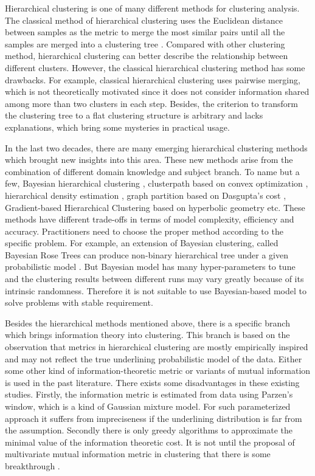 Hierarchical clustering is one of many different methods for clustering analysis.
The classical method of hierarchical clustering uses the Euclidean distance between samples
as the metric to merge the most similar pairs until all the samples are merged into a clustering
tree \citep{slink}. Compared with other clustering method, hierarchical clustering can better describe the relationship between different clusters. However, the classical hierarchical clustering method has some
drawbacks. For example, classical hierarchical clustering uses pairwise merging, which is not theoretically motivated since it does not consider information shared among more than two clusters in each step. Besides, the criterion to transform the clustering tree to a flat clustering structure is arbitrary and lacks explanations, which bring some mysteries in practical
usage.

In the last two decades, there are many emerging hierarchical clustering methods which brought new insights into this area. These new methods arise from the combination of different domain knowledge and
subject branch. To name but a few, 
Bayesian hierarchical clustering \citep{bhc},
clusterpath based on convex optimization \citep{hocking2011clusterpath},
hierarchical density estimation \citep{hde}, 
graph partition based on Dasgupta's cost \citep{dasgupta2016cost},
Gradient-based Hierarchical Clustering based on hyperbolic geometry \citep{hyperbolic} etc.
These methods have different trade-offs in terms of model complexity, efficiency and accuracy.
Practitioners need to choose the proper method according to the specific problem.
For example, an extension of Bayesian clustering, called Bayesian Rose Trees 
can produce non-binary hierarchical tree
under a given probabilistic model \citep{blundell2011discovering}.
But Bayesian model has many hyper-parameters to tune and the clustering results between different runs may vary greatly because of its intrinsic randomness. Therefore it is not suitable to use Bayesian-based model to solve problems with stable requirement.


Besides the hierarchical methods mentioned above, there is a specific branch which brings information theory into clustering. This branch is based on the observation that metrics in hierarchical clustering
are mostly empirically inspired and may not reflect the true underlining probabilistic model of the data.
Either some other kind of information-theoretic metric \citep{ic2002} or variants of mutual information \citep{mim} is used in the past literature. There exists some disadvantages in these existing studies. Firstly, the information metric is estimated from data using Parzen's window, which is a kind of Gaussian mixture model. For such parameterized approach it suffers from impreciseness if the underlining distribution is far from the assumption.
Secondly there is only greedy algorithms to approximate the minimal value of the information theoretic cost. It is not until the proposal of multivariate mutual information metric in clustering that there is some breakthrough \citep{ic2016}.

